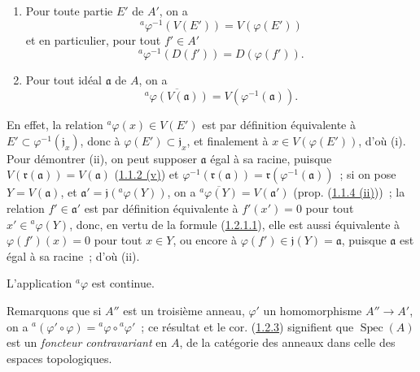 \begin{proposition}[1.2.2]
\label{I.1.2.2-fr}
\begin{enumerate}
  \item[\rm(i)] Pour toute partie $E'$ de $A'$, on a
  \begin{equation}
    {}^a\varphi^{-1}(V(E'))=V(\varphi(E'))
    \tag{1.2.2.1}\label{I.1.2.2.1-fr}
  \end{equation}
  et en particulier, pour tout $f'\in A'$
  \begin{equation}
    {}^a\varphi^{-1}(D(f'))=D(\varphi(f')).
    \tag{1.2.2.2}\label{I.1.2.2.2-fr}
  \end{equation}
  \item[\rm(ii)] Pour tout idéal $\mathfrak{a}$ de $A$, on a
  \begin{equation}
    \overline{{}^a\varphi(V(\mathfrak{a}))}
    =V(\varphi^{-1}(\mathfrak{a})).
    \tag{1.2.2.3}\label{I.1.2.2.3-fr}
  \end{equation}
\end{enumerate}
\end{proposition}

En effet, la relation ${}^a\varphi(x)\in V(E')$ est par définition
équivalente à $E'\subset\varphi^{-1}(\mathfrak{j}_x)$, donc à
$\varphi(E')\subset\mathfrak{j}_x$, et finalement à
$x\in V(\varphi(E'))$, d'où (i). Pour démontrer (ii), on peut supposer
$\mathfrak{a}$ égal à sa racine, puisque
$V(\mathfrak{r}(\mathfrak{a}))=V(\mathfrak{a})$
(\hyperref[I.1.1.2-fr]{1.1.2 (v)}) et
$\varphi^{-1}(\mathfrak{r}(\mathfrak{a}))
=\mathfrak{r}(\varphi^{-1}(\mathfrak{a}))$~; si on pose
$Y=V(\mathfrak{a})$, et
$\mathfrak{a}'=\mathfrak{j}({}^a\varphi(Y))$, on a
$\overline{{}^a\varphi(Y)}=V(\mathfrak{a}')$ (prop.
(\hyperref[I.1.1.4-fr]{1.1.4 (ii)}))~; la relation
$f'\in\mathfrak{a}'$ est par définition équivalente à $f'(x')=0$ pour tout
$x'\in{}^a\varphi(Y)$, donc, en vertu de la formule
(\hyperref[I.1.2.1.1-fr]{1.2.1.1}), elle est aussi équivalente à
$\varphi(f')(x)=0$ pour tout $x\in Y$, ou encore à
$\varphi(f')\in\mathfrak{j}(Y)=\mathfrak{a}$, puisque $\mathfrak{a}$ est
égal à sa racine~; d'où (ii).

\begin{corollary}[1.2.3]
\label{I.1.2.3-fr}
L'application ${}^a\varphi$ est continue.
\end{corollary}

Remarquons que si $A''$ est un troisième anneau, $\varphi'$ un homomorphisme
$A''\to A'$, on a
${}^a(\varphi'\circ\varphi)={}^a\varphi\circ{}^a\varphi'$~; ce résultat et le
cor. (\hyperref[I.1.2.3-fr]{1.2.3}) signifient que
$\operatorname{Spec}(A)$ est un \emph{foncteur contravariant} en $A$, de la
catégorie des anneaux dans celle des espaces topologiques.

